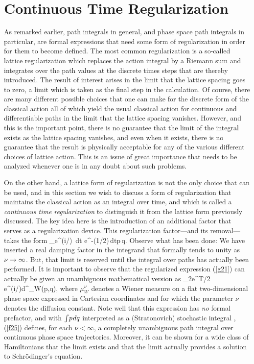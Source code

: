 \section{Continuous Time Regularization}
As remarked earlier, path integrals in general, and phase space path 
integrals in particular, are formal expressions that need some form of 
regularization in order for them to become defined. The most common 
regularization is a so-called lattice regularization which replaces the 
action integral by a Riemann sum and integrates over the path values at 
the discrete times steps that are thereby introduced. The result of 
interest arises in the limit that the lattice spacing goes to zero, a 
limit which is taken as the final step in the calculation. Of course, 
there are many different possible choices that one can make for the discrete 
form of the classical action all of which yield the usual classical action 
for continuous and differentiable paths in the limit that the lattice 
spacing vanishes. However, and this is the important point, there is no 
guarantee that the limit of the integral exists as the lattice spacing 
vanishes, and even when it exists, there is no guarantee that the result 
is physically acceptable for any of the various different choices of 
lattice action. This is an issue of great importance that needs to be 
analyzed whenever one is in any doubt about such problems.

On the other hand, a lattice form of regularization is not the only choice 
that can be used, and in this section we wish to discuss a form of 
regularization that maintains the classical action as an integral over 
time, and which is called a {\it continuous time regularization} to 
distinguish it from the lattice form previously discussed. The key idea 
here is the introduction of an additional factor that serves as a 
regularization device. This regularization factor---and its removal---takes 
the form \cite{dau}
  \bn \lim_{\nu\ra\infty}\int e^{(i/\hbar)
\tint[p\s{\dot q}-H(p,q)]\,dt}\;
e^{-(1/2\nu)\,dt}\;\D p\,\D q\;.  \label{g21}\en
Observe what has been done: We have inserted a real damping factor in the 
integrand that formally tends to unity as $\nu\rightarrow\infty$. But, that limit 
is reserved until the integral over paths has actually been performed. It 
is important to observe that the regularized expression (\ref{g21}) can 
actually be given an unambiguous mathematical version as
  \bn \lim_{\nu\ra\infty}2\pi\s e^{\nu T/2\hbar}\int 
e^{(i/\hbar)\tint[p\s dq-H(p,q)\s dt]}\;d\mu^\nu_W(p,q)\;, \label{f25}\en
where $\mu^\nu_W$ denotes a Wiener measure on a flat two-dimensional 
phase space expressed in Cartesian coordinates and for which the parameter 
$\nu$ denotes the diffusion constant. Note well that this expression 
has {\it no} formal prefactor, and with ${\textstyle\int} p\hskip.08em dq$ interpreted as a 
(Stratonovich) stochastic integral \cite{jjj}, (\ref{f25}) defines, for 
each $\nu<\infty$, a completely unambiguous path integral over continuous 
phase space trajectories. Moreover, it can be shown \cite{dau} for a wide 
class of Hamiltonians that the limit exists and that the limit actually 
provides a solution to Schr\"odinger's equation.  

